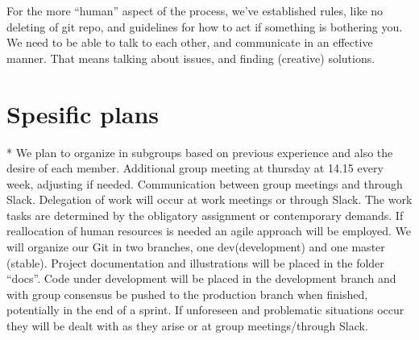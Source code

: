 \documentclass{article}
\begin{document}
For the more “human” aspect of the process, we’ve established rules, like no deleting of git repo, and guidelines for how to act if something is bothering you. We need to be able to talk to each other, and communicate in an effective manner. That means talking about issues, and finding (creative) solutions. 

\section*{Spesific plans}
* We plan to organize in subgroups based on previous experience and also the desire of each member.
\newline * Additional group meeting at thursday at 14.15 every week, adjusting if needed.
\newline * Communication between group meetings and through Slack.
\newline * Delegation of work will occur at work meetings or through Slack. The work tasks are determined by the obligatory assignment or contemporary demands. If reallocation of human resources is needed an agile approach will be employed. 
\newline * We will organize our Git in two branches, one dev(development) and one master (stable).
\newline * Project documentation and illustrations will be placed in the folder “docs”. 
\newline * Code under development will be placed in the development branch and with group consensus be pushed to the production branch when finished, potentially in the end of a sprint.
\newline * If unforeseen and problematic situations occur they will be dealt with as they arise or at group meetings/through Slack.
\end{document}
